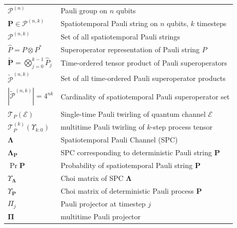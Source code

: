 \begin{table}[h!]
\begin{tabular}{ll}
\(\mathcal{P}^{(n)}\) & Pauli group on \(n\) qubits \\
\(\mathbf{P} \in \mathcal{P}^{(n,k)}\) & Spatiotemporal Pauli string on \(n\) qubits, \(k\) timesteps  \\
\(\mathcal{P}^{(n,k)}\) & Set of all spatiotemporal Pauli strings  \\
\(\hat{P} = P \otimes P^*\) & Superoperator representation of Pauli string \(P\)  \\
\(\tilde{\mathbf{P}} = \bigotimes_{j=0}^{k-1} \hat{P}_j\) & Time-ordered tensor product of Pauli superoperators  \\
\(\tilde{\mathcal{P}}^{(n,k)}\) & Set of all time-ordered Pauli superoperator products  \\
\(|\tilde{\mathcal{P}}^{(n,k)}| = 4^{nk}\) & Cardinality of spatiotemporal Pauli superoperator set  \\
\(\mathcal{T}_P(\mathcal{E})\) & Single-time Pauli twirling of quantum channel \(\mathcal{E}\)  \\
\(\mathcal{T}^{(k)}_P(\Upsilon_{k:0})\) & multitime Pauli twirling of \(k\)-step process tensor  \\ %
\(\mathbf{\Lambda}\) & Spatiotemporal Pauli Channel (SPC)  \\
\(\mathbf{\Lambda}_{\mathbf{P}}\) & SPC corresponding to deterministic Pauli string \(\mathbf{P}\)  \\
\(\Pr{\mathbf{P}}\) & Probability of spatiotemporal Pauli string \(\mathbf{P}\)  \\
\(\Upsilon_{\bm{\Lambda}}\) & Choi matrix of SPC \(\mathbf{\Lambda}\)  \\
\(\Upsilon_{\mathbf{P}}\) & Choi matrix of deterministic Pauli process \(\mathbf{P}\)  \\
\(\Pi_j\) & Pauli projector at timestep \(j\)  \\
\(\mathbf{\Pi}\) & multitime Pauli projector  \\
\hline
\end{tabular}
\label{tab:spc-notation}
\end{table}

